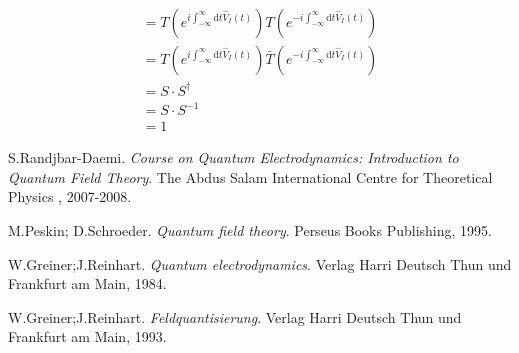 \documentclass[12pt, titlepage]{article}
\begin{document}
\begin{subappendices}
\begin{subequations}
\begin{align}
		&=	
				T
	\left( 
	e^{i\int_{-\infty}^{\infty}\mathrm{d}t \hat{V}_{I}(t)
	}	
	\right) 	
	T
	\left(
	e^{
	-i\int_{-\infty}^{\infty}\mathrm{d}t \hat{V}_{I}(t)
	}
	\right) 	
		&\\
		&=	
				T
	\left( 
	e^{i\int_{-\infty}^{\infty}\mathrm{d}t \hat{V}_{I}(t)
	}	
	\right) 	
	\bar{T}
	\left(
	e^{
	-i\int_{-\infty}^{\infty}\mathrm{d}t \hat{V}_{I}(t)
	}
	\right) 	
	&\\
	&=	S \cdot S^{\dagger}
	&\\
	&=	S \cdot S^{-1}	
	&\\
	&=	1
\end{align}
\end{subequations}
\end{subappendices}

\newpage
\begin{thebibliography}{12}
S.Randjbar-Daemi.
\textit{Course on Quantum Electrodynamics: Introduction to Quantum Field Theory}.
 The Abdus Salam International Centre for Theoretical Physics , 2007-2008.
 
M.Peskin; D.Schroeder. 
\textit{Quantum field theory}. 
Perseus Books Publishing, 1995.
 
W.Greiner;J.Reinhart.
\textit{Quantum electrodynamics}.
 Verlag Harri Deutsch Thun und Frankfurt am Main, 1984.
 
W.Greiner;J.Reinhart.
\textit{Feldquantisierung}.
 Verlag Harri Deutsch Thun und Frankfurt am Main, 1993.
\end{thebibliography}


\end{document}

